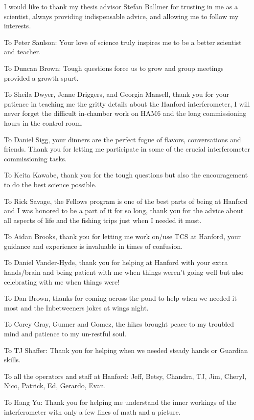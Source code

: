 	I would like to thank my thesis advisor Stefan Ballmer for trusting in me as a scientist, always providing indispensable advice, and allowing me to follow my interests.
	
	To Peter Saulson: Your love of science truly inspires me to be a better scientist and teacher.
	
	To Duncan Brown:  Tough questions force us to grow and group meetings provided a growth spurt.
	
	To Sheila Dwyer, Jenne Driggers, and Georgia Mansell, thank you for your patience in teaching me the gritty details about the Hanford interferometer, I will never forget the difficult in-chamber work on HAM6 and the long commissioning hours in the control room.
	
	To Daniel Sigg, your dinners are the perfect fugue of flavors, conversations and friends. Thank you for letting me participate in some of the crucial interferometer commissioning tasks.
	
	To Keita Kawabe, thank you for the tough questions but also the encouragement to do the best science possible.
	
	To Rick Savage, the Fellows program is one of the best parts of being at Hanford and I was honored to be a part of it for so long, thank you for the advice about all aspects of life and the fishing trips just when I needed it most.
	
	To Aidan Brooks, thank you for letting me work on/use TCS at Hanford, your guidance and experience is invaluable in times of confusion.
	
	To Daniel Vander-Hyde, thank you for helping at Hanford with your extra hands/brain and being patient with me when things weren't going well but also celebrating with me when things were!
	
	To Dan Brown, thanks for coming across the pond to help when we needed it most and the Inbetweeners jokes at wings night.
	
	To Corey Gray, Gunner and Gomez, the hikes brought peace to my troubled mind and patience to my un-restful soul.
	
	To TJ Shaffer: Thank you for helping when we needed steady hands or Guardian skills.
	
	To all the operators and staff at Hanford: Jeff, Betsy, Chandra, TJ, Jim, Cheryl, Nico, Patrick, Ed, Gerardo, Evan.
	
	To Hang Yu: Thank you for helping me understand the inner workings of the interferometer with only a few lines of math and a picture.
	
